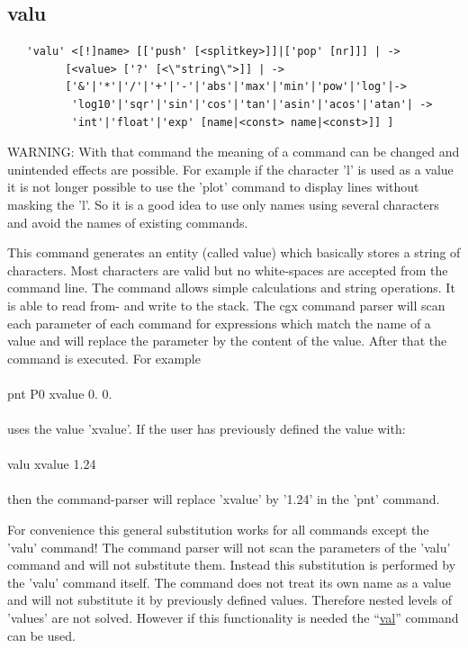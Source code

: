 \documentclass{article}
\providecommand{\htmlref}[2]{\hyperref[#2]{#1}}
\begin{document}
\subsection{\label{valu}valu}
\begin{verbatim}
   'valu' <[!]name> [['push' [<splitkey>]]|['pop' [nr]]] | ->
         [<value> ['?' [<\"string\">]] | ->
         ['&'|'*'|'/'|'+'|'-'|'abs'|'max'|'min'|'pow'|'log'|->
          'log10'|'sqr'|'sin'|'cos'|'tan'|'asin'|'acos'|'atan'| ->
          'int'|'float'|'exp' [name|<const> name|<const>]] ]
\end{verbatim}
WARNING: With that command the meaning of a command can be changed and unintended effects are possible. For example if the character 'l' is used as a value it is not longer possible to use the 'plot' command to display lines without masking the 'l'. So it is a good idea to use only names using several characters and avoid the names of existing commands.

This command generates an entity (called value) which basically stores a string of characters. Most characters are valid but no white-spaces are accepted from the command line. The command allows simple calculations and string operations. It is able to read from- and write to the stack.
The cgx command parser will scan each parameter of each command for expressions which match the name of a value and will replace the parameter by the content of the value. After that the command is executed. For example\\\\pnt P0 xvalue 0. 0.\\\\uses the value 'xvalue'. If the user has previously defined the value with:\\\\valu xvalue 1.24\\\\then the command-parser will replace 'xvalue' by '1.24' in the 'pnt' command.

For convenience this general substitution works for all commands except the 'valu' command! The command parser will not scan the parameters of the 'valu' command and will not substitute them. Instead this substitution is performed by the 'valu' command itself. The command does not treat its own name as a value and will not substitute it by previously defined values. Therefore nested levels of 'values' are not solved. However if this functionality is needed the ``\htmlref{val}{val}'' command can be used.\\\\
\end{document}
